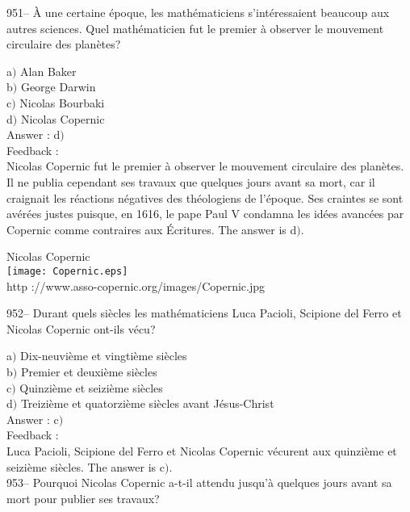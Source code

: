 \documentclass[letterpaper, 12pt]{article}
\begin{document}
951-- \`A une certaine \'epoque, les math\'ematiciens
s'int\'eressaient beaucoup aux autres sciences. Quel math\'ematicien
fut le premier \`a observer le mouvement circulaire des plan\`etes?

a$)$ Alan Baker \\
b$)$ George Darwin \\
c$)$ Nicolas Bourbaki  \\
d$)$ Nicolas Copernic \\

Answer : d$)$\\

Feedback : \\
Nicolas Copernic fut le premier \`a observer le mouvement circulaire
des plan\`etes. Il ne publia cependant ses travaux que quelques
jours avant sa mort, car il craignait les r\'eactions n\'egatives
des th\'eologiens de l'\'epoque. Ses craintes se sont av\'er\'ees
justes puisque, en 1616, le pape Paul V condamna les id\'ees
avanc\'ees par Copernic comme \og contraires aux
\'Ecritures\fg . The answer is d$)$.\\

        \begin{center}
        Nicolas Copernic\\
    \texttt{[image: Copernic.eps]}\\
        {\footnotesize http ://www.asso-copernic.org/images/Copernic.jpg}
    \end{center}

952-- Durant quels si\`ecles les math\'ematiciens Luca Pacioli,
Scipione del Ferro et Nicolas Copernic ont-ils v\'ecu?

a$)$ Dix-neuvi\`eme et vingti\`eme si\`ecles \\
b$)$ Premier et deuxi\`eme si\`ecles \\
c$)$ Quinzi\`eme et seizi\`eme si\`ecles  \\
d$)$ Treizi\`eme et quatorzi\`eme si\`ecles avant J\'esus-Christ\\

Answer : c$)$\\

Feedback : \\
Luca Pacioli, Scipione del Ferro et Nicolas Copernic v\'ecurent aux
quinzi\`eme et seizi\`eme si\`ecles. The answer is c$)$.\\

953-- Pourquoi Nicolas Copernic a-t-il attendu jusqu'\`a quelques
jours avant sa mort pour publier ses travaux?
\end{document}
